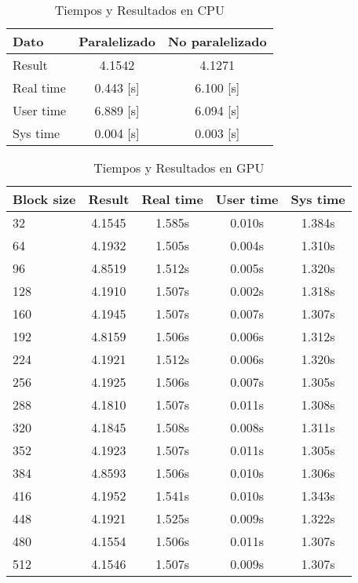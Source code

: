 	\begin{table}[h!]
		\begin{center}
		\begin{tabular}{|l|c|c|}
			\hline	
			\textbf{Dato} & \textbf{Paralelizado} & \textbf{No paralelizado} \\\hline
			Result    & 4.1542 & 4.1271 \\
			Real time & 0.443 [s] & 6.100 [s] \\
			User time & 6.889 [s] & 6.094 [s] \\
			Sys  time & 0.004 [s] & 0.003 [s] \\\hline
		\end{tabular}
		\label{tab:1}
		\caption{Tiempos y Resultados en CPU}
		\end{center}
	\end{table}
	

	\begin{table}[h!]
		\begin{center}
		\begin{tabular}{|l|c|c|c|c|}
			\hline	
			\textbf{Block size} & \textbf{Result}  &\textbf{Real time} &\textbf{User time}	&\textbf{Sys  time}	\\\hline 
			32  & 4.1545 & 1.585s & 0.010s & 1.384s \\\hline
			64  & 4.1932 & 1.505s & 0.004s & 1.310s \\\hline
			96  & 4.8519 & 1.512s & 0.005s & 1.320s \\\hline
 			128 & 4.1910 & 1.507s & 0.002s & 1.318s \\\hline
			160 & 4.1945 & 1.507s & 0.007s & 1.307s \\\hline
			192 & 4.8159 & 1.506s & 0.006s & 1.312s \\\hline
			224 & 4.1921 & 1.512s & 0.006s & 1.320s \\\hline
			256 & 4.1925 & 1.506s & 0.007s & 1.305s \\\hline
			288 & 4.1810 & 1.507s & 0.011s & 1.308s \\\hline
			320 & 4.1845 & 1.508s & 0.008s & 1.311s \\\hline
			352 & 4.1923 & 1.507s & 0.011s & 1.305s \\\hline
			384 & 4.8593 & 1.506s & 0.010s & 1.306s \\\hline
			416 & 4.1952 & 1.541s & 0.010s & 1.343s \\\hline
			448 & 4.1921 & 1.525s & 0.009s & 1.322s \\\hline
			480 & 4.1554 & 1.506s & 0.011s & 1.307s \\\hline
			512 & 4.1546 & 1.507s & 0.009s & 1.307s \\\hline
		\end{tabular}
		\label{tab:2}
		\caption{Tiempos y Resultados en GPU}
		\end{center}
	\end{table}
